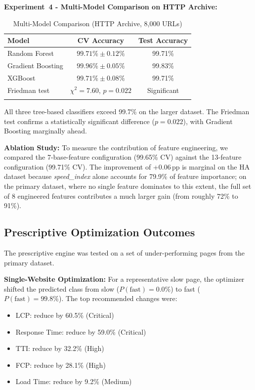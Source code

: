 \documentclass[sn-nature]{sn-jnl}
\begin{document}
\textbf{Experiment~4 - Multi-Model Comparison on HTTP Archive:}

\begin{table}[htbp]
\caption{Multi-Model Comparison (HTTP Archive, 8,000 URLs)}\label{tab:ha_models}
\centering
\begin{tabular}{l c c}
\toprule
Model & CV Accuracy & Test Accuracy \\
\midrule
Random Forest & $99.71\% \pm 0.12\%$ & 99.71\% \\
Gradient Boosting & $99.96\% \pm 0.05\%$ & 99.83\% \\
XGBoost & $99.71\% \pm 0.08\%$ & 99.71\% \\
Friedman test & $\chi^2 = 7.60$, $p = 0.022$ & Significant \\
\botrule
\end{tabular}
\end{table}

All three tree-based classifiers exceed 99.7\% on the larger dataset. The Friedman test confirms a statistically significant difference ($p = 0.022$), with Gradient Boosting marginally ahead.

\textbf{Ablation Study:} To measure the contribution of feature engineering, we compared the 7-base-feature configuration (99.65\% CV) against the 13-feature configuration (99.71\% CV). The improvement of +0.06\,pp is marginal on the HA dataset because \textit{speed\_index} alone accounts for 79.9\% of feature importance; on the primary dataset, where no single feature dominates to this extent, the full set of 8 engineered features contributes a much larger gain (from roughly 72\% to 91\%).

\subsection{Prescriptive Optimization Outcomes}

The prescriptive engine was tested on a set of under-performing pages from the primary dataset.

\textbf{Single-Website Optimization:} For a representative slow page, the optimizer shifted the predicted class from slow ($P(\text{fast}) = 0.0\%$) to fast ($P(\text{fast}) = 99.8\%$). The top recommended changes were:
\begin{itemize}
    \item LCP: reduce by 60.5\% (Critical)
    \item Response Time: reduce by 59.0\% (Critical)
    \item TTI: reduce by 32.2\% (High)
    \item FCP: reduce by 28.1\% (High)
    \item Load Time: reduce by 9.2\% (Medium)
\end{itemize}
\end{document}
